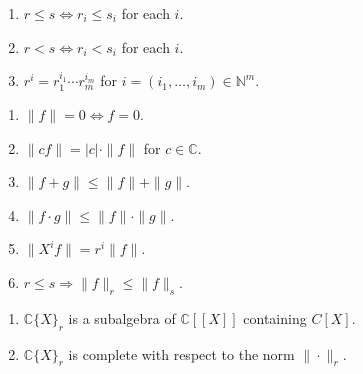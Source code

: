 \begin{enumerate}
  \item  $r\leq s \Leftrightarrow r_i \leq s_i$ for each $i$.
  \item  $r < s \Leftrightarrow r_i < s_i$ for each $i$.
  \item  $r^i = r_1^{i_1}\cdots r_m^{i_m}$ for $i = (i_1,\ldots, i_m)\in \mathbb{N}^m$.
\end{enumerate}
\begin{enumerate}
  \item  $\|f\| = 0 \Leftrightarrow f = 0$.
  \item  $\|c f\| = |c| \cdot \|f\|$ for $c\in \mathbb{C}$.
  \item  $\|f + g\| \leq \|f\| + \|g\|$.
  \item  $\|f\cdot g\| \leq \|f\| \cdot \|g\|$.
  \item  $\|X^i f\| = r^i \|f\|$.
  \item  $r\leq s \Rightarrow \|f\|_r \leq \|f\|_s$.
\end{enumerate}
\begin{enumerate}
  \item  $\mathbb{C} \{X\}_r$ is a subalgebra of $\mathbb{C}[[X]]$ containing $C[X]$.
  \item  $\mathbb{C} \{X\}_r$ is complete with respect to the norm $\|\cdot\|_r$.
\end{enumerate}
